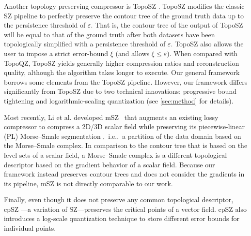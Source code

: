 Another topology-preserving compressor is TopoSZ \cite{yan2023toposz}. 
TopoSZ modifies the classic SZ pipeline to perfectly preserve the contour tree of the ground truth data up to the persistence threshold of $\varepsilon$. 
That is, the contour tree of the output of TopoSZ will be equal to that of the ground truth after both datasets have been topologically simplified with a persistence threshold of $\varepsilon$. 
TopoSZ also allows the user to impose a strict error-bound $\xi$ (and allows $\xi \leq \varepsilon$). When compared with TopoQZ, TopoSZ yields generally higher compression ratios and reconstruction quality, although the algorithm takes longer to execute. 
Our general framework borrows some elements from the TopoSZ pipeline. However, our framework differs significantly from TopoSZ due to two technical innovations: progressive bound tightening and logarithmic-scaling quantization (see \cref{sec:method} for details).  

Most recently, Li et al. developed mSZ~\cite{li2024msz} that augments an existing lossy compressor to compress a 2D/3D scalar field while preserving its piecewise-linear (PL) Morse--Smale segmentation \cite{edelsbrunner2001hierarchical,edelsbrunner2003morse},~i.e.,~a partition of the data domain based on the Morse--Smale complex. 
In comparison to the contour tree that is based on the level sets of a scalar field, a Morse--Smale complex is a different topological descriptor based on the gradient behavior of a scalar field.   
Because our framework instead preserves contour trees and does not consider the gradients in its pipeline, mSZ is not directly comparable to our work. 

Finally, even though it does not preserve any common topological descriptor, cpSZ \cite{liang2022toward}---a variation of SZ---preserves the critical points of a vector field. cpSZ also introduces a log-scale quantization technique to store different error bounds for individual points.